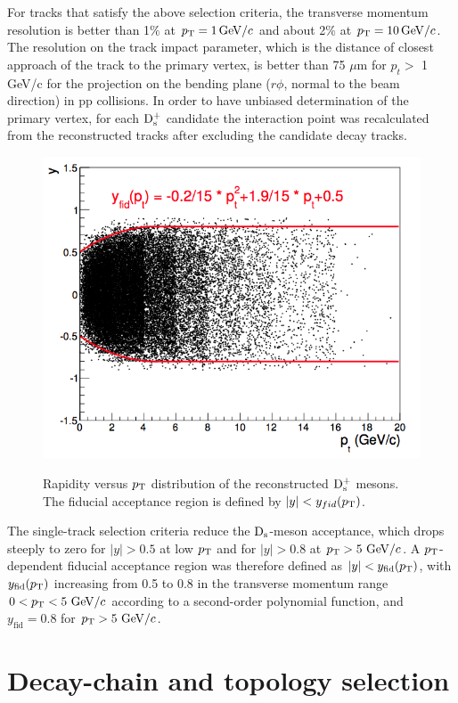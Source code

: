 For tracks that satisfy the above selection criteria, the transverse momentum 
resolution is better than 1$\%$ at $p_{\rm T} = 1\, \mathrm{GeV}/c$ and about 2\% at $p_{\rm T} = 10 \, \mathrm{GeV}/c$. 
The resolution on the track impact parameter, which is the distance of closest 
approach of the track to the primary vertex, is better than 75 $\mu$m for 
$p_t >$ 1 GeV/c for the projection on the bending plane ($r\phi$, normal to 
the beam direction) in pp collisions.
In order to have unbiased determination of the primary vertex, for each 
${\rm D_s^+}$ candidate the interaction point was recalculated from the reconstructed 
tracks after excluding the candidate decay tracks.
\begin{figure}[!htbp]
\begin{center}
\includegraphics[width=.5\textwidth]{FigCap4/YvsPt.png}
\label{fig:singtrafter}
\caption{Rapidity versus $p_{\rm T}$ distribution of the reconstructed ${\rm D_s^+}$ mesons. The fiducial acceptance region is defined by $|y| < y_{fid}(p_{\rm T})$.}
\end{center}
\end{figure}

The single-track selection criteria reduce the ${\rm D_s}$-meson acceptance, which drops 
steeply to zero for $|y| > 0.5$ at low $p_{\rm T}$ and for $|y| > 0.8$ 
at $p_{\rm T} > 5~\mathrm{GeV}/c$. A $p_{\rm T}$-dependent fiducial acceptance region was therefore defined as 
$|y| < y_{\mathrm{fid}}(p_{\rm T})$, with $y_{\mathrm{fid}}(p_{\rm T})$ increasing 
from 0.5 to 0.8 in the transverse momentum range $0 < p_{\rm T} < 5~\mathrm{GeV}/c$ 
according to a second-order polynomial function, and $y_{\mathrm{fid}}=0.8$ 
for $p_{\rm T} > 5~\mathrm{GeV}/c$.

\section{Decay-chain and topology selection}

